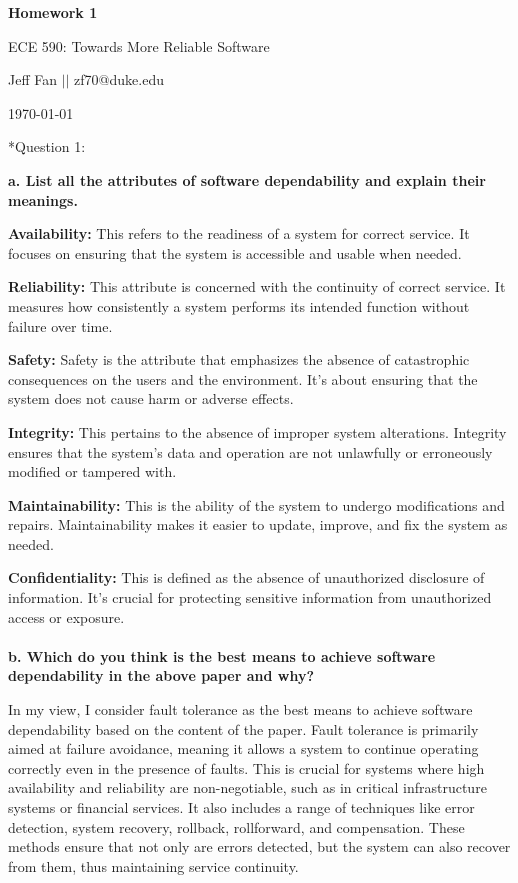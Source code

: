 \documentclass[12pt]{article}
\makeatletter
\numberwithin{table}{section}
\newcommand{\question}[2][]{\begin{flushleft}
		\Large\textbf{Question #1}: \large\textit{#2}
		
\end{flushleft}}
\newcommand{\maketitletwo}[2][]{\begin{center}
		\Large{\textbf{Homework #1}
			
			ECE 590: Towards More Reliable Software} %
		\vspace{5pt}
		
		\normalsize{Jeff Fan  \hspace{1em} $\left|\right|$ \hspace{1em}zf70@duke.edu  %
			
			\today}        %
		\vspace{15pt}
		
\end{center}}
\makeatother
\begin{document}
	\maketitletwo[1]  %
	
\section*{Question 1: } 

\textbf{a. List all the attributes of software dependability and explain their meanings.}

\textbf{Availability:} This refers to the readiness of a system for correct service. It focuses on ensuring that the system is accessible and usable when needed.

\textbf{Reliability:} This attribute is concerned with the continuity of correct service. It measures how consistently a system performs its intended function without failure over time.

\textbf{Safety:} Safety is the attribute that emphasizes the absence of catastrophic consequences on the users and the environment. It's about ensuring that the system does not cause harm or adverse effects.

\textbf{Integrity:} This pertains to the absence of improper system alterations. Integrity ensures that the system's data and operation are not unlawfully or erroneously modified or tampered with.

\textbf{Maintainability:} This is the ability of the system to undergo modifications and repairs. Maintainability makes it easier to update, improve, and fix the system as needed.
	
\textbf{Confidentiality:} This is defined as the absence of unauthorized disclosure of information. It's crucial for protecting sensitive information from unauthorized access or exposure.\\
\\
\textbf{b. Which do you think is the best means to achieve software dependability in the above paper and why? }

In my view, I consider fault tolerance as the best means to achieve software dependability based on the content of the paper. Fault tolerance is primarily aimed at failure avoidance, meaning it allows a system to continue operating correctly even in the presence of faults. This is crucial for systems where high availability and reliability are non-negotiable, such as in critical infrastructure systems or financial services. It also includes a range of techniques like error detection, system recovery, rollback, rollforward, and compensation. These methods ensure that not only are errors detected, but the system can also recover from them, thus maintaining service continuity. 
\end{document}
